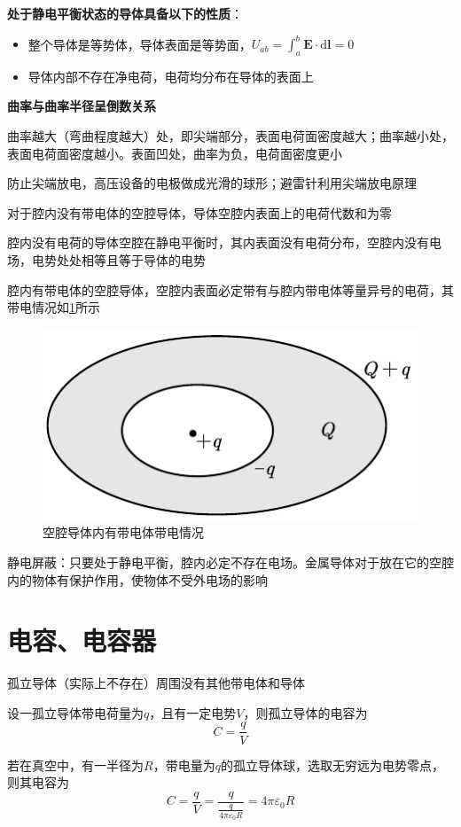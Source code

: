 \documentclass[12pt, a4paper, twoside]{ctexbook}
\begin{document}
\textbf{处于静电平衡状态的导体具备以下的性质}：
\begin{itemize}
    \item 整个导体是等势体，导体表面是等势面，$U_{ab}=\int_{a}^{b}\boldsymbol{E}\cdot\mathrm{d}\boldsymbol{l}=0$
    \item 导体内部不存在净电荷，电荷均分布在导体的表面上
\end{itemize}

\textbf{曲率与曲率半径呈倒数关系}

曲率越大（弯曲程度越大）处，即尖端部分，表面电荷面密度越大；曲率越小处，表面电荷面密度越小。表面凹处，曲率为负，电荷面密度更小

防止尖端放电，高压设备的电极做成光滑的球形；避雷针利用尖端放电原理

对于腔内没有带电体的空腔导体，导体空腔内表面上的电荷代数和为零

腔内没有电荷的导体空腔在静电平衡时，其内表面没有电荷分布，空腔内没有电场，电势处处相等且等于导体的电势

腔内有带电体的空腔导体，空腔内表面必定带有与腔内带电体等量异号的电荷，其带电情况如\textcolor{blue}{\cref{fig:空腔导体内有带电体带电情况}}所示
\begin{figure}[H]
    \centerline{\includegraphics[scale=1.0]{空腔导体内有带电体带电情况.pdf}}
    \caption{空腔导体内有带电体带电情况}\label{fig:空腔导体内有带电体带电情况}
\end{figure}
{\sonti 静电屏蔽}：只要处于静电平衡，腔内必定不存在电场。金属导体对于放在它的空腔内的物体有保护作用，使物体不受外电场的影响
\section{电容、电容器}
{\sonti 孤立导体（实际上不存在）}周围没有其他带电体和导体

设一孤立导体带电荷量为$q$，且有一定电势$V$，则孤立导体的电容为
$$
C=\frac{q}{V}
$$

若在真空中，有一半径为$R$，带电量为$q$的孤立导体球，选取无穷远为电势零点，则其电容为
$$
C=\frac{q}{V}=\frac{q}{\frac{q}{4\pi\varepsilon_0R}}=4\pi\varepsilon_0R
$$
\end{document}
